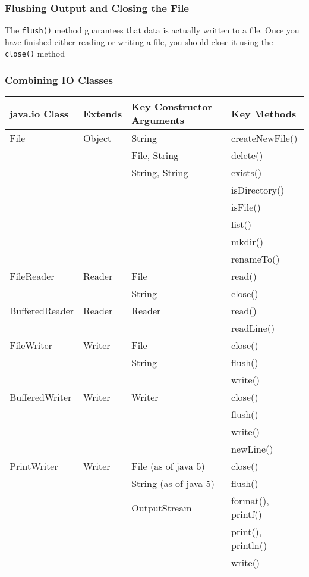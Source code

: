 \subsubsection{Flushing Output and Closing the File}
The \verb#flush()# method guarantees that data is actually written to a file.  
Once you have finished either reading or writing a file, you should close it 
using the \verb#close()# method

\subsubsection{Combining IO Classes}
\begin{center}
\begin{tabular}{llll}
    \textbf{java.io Class} & \textbf{Extends} & \textbf{Key Constructor 
    Arguments} & \textbf{Key Methods} \\
    \hline
    File & Object & String & createNewFile() \\
    & & File, String & delete() \\
    & & String, String & exists() \\
    & & & isDirectory() \\
    & & & isFile() \\
    & & & list() \\
    & & & mkdir() \\
    & & & renameTo() \\
    \hline
    FileReader & Reader & File & read() \\
    & & String & close() \\
    \hline
    BufferedReader & Reader & Reader & read() \\
    & & & readLine() \\
    \hline
    FileWriter & Writer & File & close() \\
    & & String & flush() \\
    & & & write() \\
    \hline
    BufferedWriter & Writer & Writer & close() \\
    & & & flush() \\
    & & & write() \\
    & & & newLine() \\
    \hline
    PrintWriter & Writer & File (as of java 5) & close() \\
    & & String (as of java 5) & flush() \\
    & & OutputStream & format(), printf() \\
    & & & print(), println() \\
    & & & write() \\
\end{tabular}
\end{center}

